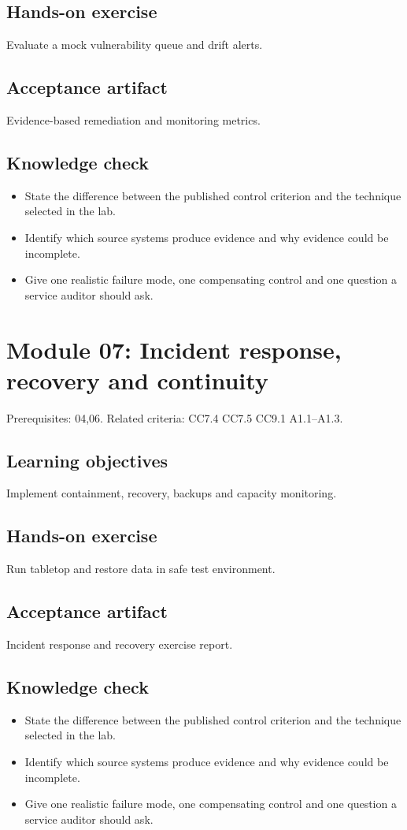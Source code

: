 \documentclass[10pt,oneside]{report}
\begin{document}
\subsection{Hands-on exercise}
Evaluate a mock vulnerability queue and drift alerts.

\subsection{Acceptance artifact}
Evidence-based remediation and monitoring metrics.

\subsection{Knowledge check}
\begin{itemize}
\item State the difference between the published control criterion and the technique selected in the lab.
\item Identify which source systems produce evidence and why evidence could be incomplete.
\item Give one realistic failure mode, one compensating control and one question a service auditor should ask.
\end{itemize}

\section{Module 07: Incident response, recovery and continuity}
Prerequisites: 04,06. Related criteria: CC7.4 CC7.5 CC9.1 A1.1--A1.3.

\subsection{Learning objectives}
Implement containment, recovery, backups and capacity monitoring.

\subsection{Hands-on exercise}
Run tabletop and restore data in safe test environment.

\subsection{Acceptance artifact}
Incident response and recovery exercise report.

\subsection{Knowledge check}
\begin{itemize}
\item State the difference between the published control criterion and the technique selected in the lab.
\item Identify which source systems produce evidence and why evidence could be incomplete.
\item Give one realistic failure mode, one compensating control and one question a service auditor should ask.
\end{itemize}
\end{document}
